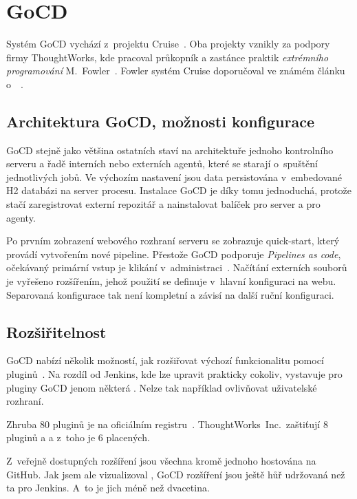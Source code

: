\section{GoCD}
    Systém GoCD vychází z~projektu Cruise~\cite{thoughtworks-gocd}. Oba projekty vznikly za podpory firmy ThoughtWorks, kde pracoval průkopník a zastánce praktik \textit{extrémního programování} M.~Fowler~\cite{fowler-go}. Fowler systém Cruise doporučoval ve známém článku o~\CI~\cite{fowler-ci}.

    \subsection{Architektura GoCD, možnosti konfigurace}
        GoCD stejně jako většina ostatních \CI staví na architektuře jednoho kontrolního serveru a řadě interních nebo externích agentů, které se starají o~spuštění jednotlivých jobů. Ve výchozím nastavení jsou data persistována v~embedované H2 databázi na server procesu. Instalace GoCD je díky tomu jednoduchá, protože stačí zaregistrovat externí repozitář a nainstalovat balíček pro server a pro agenty.

        Po prvním zobrazení webového rozhraní serveru se zobrazuje quick-start, který provádí vytvořením nové pipeline. Přestože GoCD podporuje \textit{Pipelines as code}, očekávaný primární vstup je klikání v~administraci~\cite{gocd-pas}. Načítání externích souborů je vyřešeno rozšířením, jehož použití se definuje v~hlavní  konfiguraci na webu. Separovaná konfigurace tak není kompletní a závisí na další ruční konfiguraci.

    \subsection{Rozšiřitelnost}
        GoCD nabízí několik možností, jak rozšiřovat výchozí funkcionalitu pomocí pluginů~\cite{gocd-extensions}. Na rozdíl od Jenkins, kde lze upravit prakticky cokoliv, vystavuje pro pluginy GoCD jenom některá . Nelze tak například ovlivňovat uživatelské rozhraní.

        Zhruba 80 pluginů je na oficiálním registru~\cite{gocd-plugins}. ThoughtWorks~Inc.~zaštiťují 8 pluginů a a z~toho je 6 placených.

        Z~veřejně dostupných rozšíření jsou všechna kromě jednoho hostována na GitHub. Jak jsem ale vizualizoval , GoCD rozšíření jsou ještě hůř udržovaná než ta pro Jenkins. A~to je jich méně než dvacetina.

